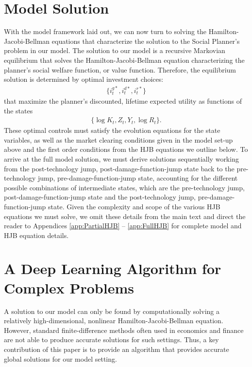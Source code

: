 \documentclass[12pt]{article}
\begin{document}
\section{Model Solution}

With the model framework laid out, we can now turn to solving the Hamilton-Jacobi-Bellman equations that characterize the solution to the Social Planner's problem in our model. The solution to our model is a recursive Markovian equilibrium that solves the Hamilton-Jacobi-Bellman equation characterizing the planner's social welfare function, or value function. Therefore, the equilibrium solution is determined by optimal investment choices: 
\begin{eqnarray*}
\{ i_t^{g*}, i_t^{d*}, i_t^{r*} \}
\end{eqnarray*} 
that maximize the planner's discounted, lifetime expected utility as functions of the states 
\begin{eqnarray*}
\{\log K_t ,Z_t ,Y_{t}, \log R_t\}.    
\end{eqnarray*} 
These optimal controls must satisfy the evolution equations for the state variables, as well as the market clearing conditions given in the model set-up above and the first order conditions from the HJB equations we outline below. To arrive at the full model solution, we must derive solutions sequentially working from the post-technology jump, post-damage-function-jump state back to the pre-technology jump, pre-damage-function-jump state, accounting for the different possible combinations of intermediate states, which are the pre-technology jump, post-damage-function-jump state and the post-technology jump, pre-damage-function-jump state. Given the complexity and scope of the various HJB equations we must solve, we omit these details from the main text and direct the reader to Appendices \ref{app:PartialHJB} -- \ref{app:FullHJB} for complete model and HJB equation details. 




\section{A Deep Learning Algorithm for Complex Problems}

A solution to our model can only be found by computationally solving a relatively high-dimensional, nonlinear Hamilton-Jacobi-Bellman equation. However, standard finite-difference methods often used in economics and finance are not able to produce accurate solutions for such settings. Thus, a key contribution of this paper is to provide an algorithm that provides accurate global solutions for our model setting.  
\end{document}
